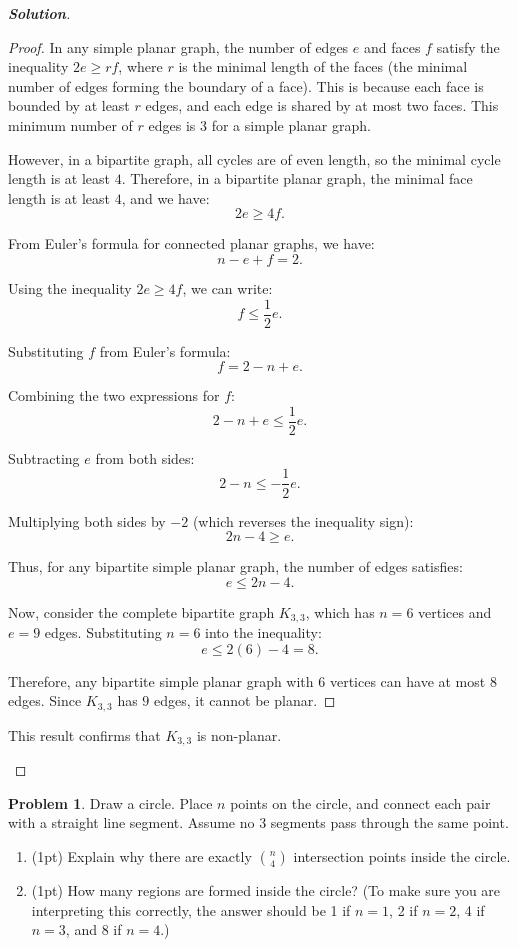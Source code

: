 \documentclass[12pt]{article}
\theoremstyle{definition}
\newtheorem{p}{Problem}
\newenvironment{solution}
  {\begin{mdframed}[linewidth=0.5pt, roundcorner=10pt, linecolor=black]\begin{proof}[\bfseries Solution]}
  {\qedhere\end{proof}\end{mdframed}}
\begin{document}
  \begin{solution}
  \begin{proof} 
  In any simple planar graph, the number of edges $e$ and faces $f$ satisfy the inequality $2e \geq r f$, where $r$ is the minimal length of the faces (the minimal number of edges forming the boundary of a face). This is because each face is bounded by at least $r$ edges, and each edge is shared by at most two faces. This minimum number of $r$ edges is $3$ for a simple planar graph.
  
  However, in a bipartite graph, all cycles are of even length, so the minimal cycle length is at least $4$. Therefore, in a bipartite planar graph, the minimal face length is at least $4$, and we have:
  \[
  2e \ge 4f.
  \]
  
  From Euler's formula for connected planar graphs, we have:
  \[
  n - e + f = 2.
  \]
  
  Using the inequality $2e \geq 4f$, we can write:
  \[
  f \leq \frac{1}{2} e.
  \]
  
  Substituting $f$ from Euler's formula:
  \[
  f = 2 - n + e.
  \]
  
  Combining the two expressions for $f$:
  \[
  2 - n + e \leq \frac{1}{2} e.
  \]
  
  Subtracting $e$ from both sides:
  \[
  2 - n \leq -\frac{1}{2} e.
  \]
  
  Multiplying both sides by $-2$ (which reverses the inequality sign):
  \[
  2n - 4 \ge e.
  \]
  
  Thus, for any bipartite simple planar graph, the number of edges satisfies:
  \[
  e \leq 2n - 4.
  \]
  
  Now, consider the complete bipartite graph $K_{3,3}$, which has $n = 6$ vertices and $e = 9$ edges. Substituting $n = 6$ into the inequality:
  \[
  e \leq 2(6) - 4 = 8.
  \]
  
  Therefore, any bipartite simple planar graph with $6$ vertices can have at most $8$ edges. Since $K_{3,3}$ has $9$ edges, it cannot be planar. 
  \end{proof} 
  
  \begin{remark} 
  This result confirms that $K_{3,3}$ is non-planar.
  \end{remark} 
  \end{solution}
  

\vspace{0.9cm}
\begin{p}
Draw a circle. Place \( n \) points on the circle, and connect each pair with a straight line segment. Assume no 3 segments pass through the same point.
    \begin{enumerate}
        \item (1pt) Explain why there are exactly \( \binom{n}{4} \) intersection points inside the circle.
        \item (1pt) How many regions are formed inside the circle? (To make sure you are interpreting this correctly, the answer should be 1 if \( n = 1 \), 2 if \( n = 2 \), 4 if \( n = 3 \), and 8 if \( n = 4 \).)
    \end{enumerate}
\end{p}
\end{document}
